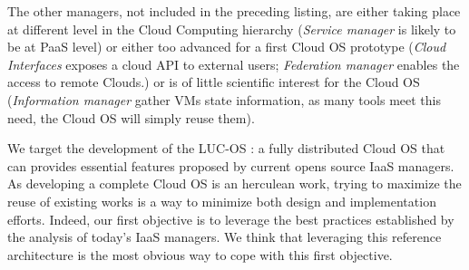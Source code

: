 The other managers, not included in the preceding listing, are either taking 
place at different level in the Cloud Computing hierarchy (\emph{Service 
manager} is likely to be at PaaS level) or either too advanced for a first Cloud
OS prototype (\emph{Cloud Interfaces} exposes a cloud API to external users; 
\emph{Federation manager} enables the access to remote Clouds.) or is of little 
scientific interest for the Cloud OS (\emph{Information manager} gather VMs 
state information, as many tools meet this need, the Cloud OS will simply 
reuse them).

We target the development of the LUC-OS : a fully distributed Cloud OS that can 
provides essential features proposed by current opens source IaaS managers. As
developing a complete Cloud OS is an herculean work, trying to maximize the 
reuse of existing works is a way to minimize both design and implementation 
efforts. Indeed, our first objective is to leverage the best practices 
established by the analysis of today's IaaS managers. We think that leveraging
this reference architecture is the most obvious way to cope with this first
objective.
